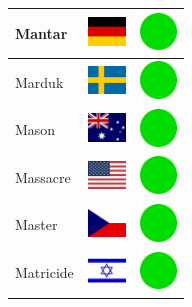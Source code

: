 \documentclass[12pt, a4paper, twoside]{report}
\begin{document}
\begin{center}
\begin{longtable}{|p{5cm}|p{2cm}|p{2cm}|}
Mantar & \includegraphics[width=1cm]{4x3/de} & \includegraphics[width=1cm]{likes/y} \\ \hline
Marduk & \includegraphics[width=1cm]{4x3/se} & \includegraphics[width=1cm]{likes/y} \\ \hline
Mason & \includegraphics[width=1cm]{4x3/au} & \includegraphics[width=1cm]{likes/y} \\ \hline
Massacre & \includegraphics[width=1cm]{4x3/us} & \includegraphics[width=1cm]{likes/y} \\ \hline
Master & \includegraphics[width=1cm]{4x3/cz} & \includegraphics[width=1cm]{likes/y} \\ \hline
Matricide & \includegraphics[width=1cm]{4x3/il} & \includegraphics[width=1cm]{likes/y} \\ \hline

\end{longtable}
\end{center}
\end{document}
